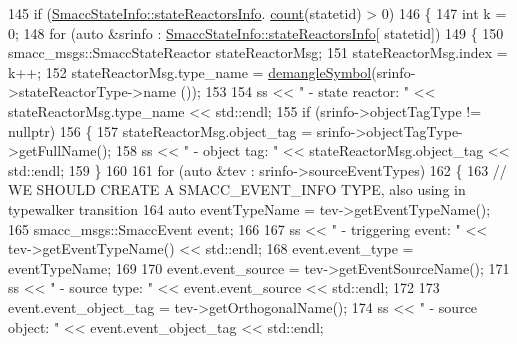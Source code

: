 \begin{DoxyCode}
145             \textcolor{keywordflow}{if} (\hyperlink{classsmacc_1_1introspection_1_1SmaccStateInfo_abd1d6ca5060c87f6bd11fde3e5b2ac4d}{SmaccStateInfo::stateReactorsInfo}.
      \hyperlink{namespacesm__fetch__two__table__whiskey__pour_acbce06cd0c9048e8be6a258e2c406986}{count}(statetid) > 0)
146             \{
147                 \textcolor{keywordtype}{int} k = 0;
148                 \textcolor{keywordflow}{for} (\textcolor{keyword}{auto} &srinfo : \hyperlink{classsmacc_1_1introspection_1_1SmaccStateInfo_abd1d6ca5060c87f6bd11fde3e5b2ac4d}{SmaccStateInfo::stateReactorsInfo}[
      statetid])
149                 \{
150                     smacc\_msgs::SmaccStateReactor stateReactorMsg;
151                     stateReactorMsg.index = k++;
152                     stateReactorMsg.type\_name = \hyperlink{namespacesmacc_1_1introspection_a2f495108db3e57604d8d3ff5ef030302}{demangleSymbol}(srinfo->stateReactorType->name
      ());
153 
154                     ss << \textcolor{stringliteral}{" - state reactor: "} << stateReactorMsg.type\_name << std::endl;
155                     \textcolor{keywordflow}{if} (srinfo->objectTagType != \textcolor{keyword}{nullptr})
156                     \{
157                         stateReactorMsg.object\_tag = srinfo->objectTagType->getFullName();
158                         ss << \textcolor{stringliteral}{"        - object tag: "} << stateReactorMsg.object\_tag << std::endl;
159                     \}
160 
161                     \textcolor{keywordflow}{for} (\textcolor{keyword}{auto} &tev : srinfo->sourceEventTypes)
162                     \{
163                         \textcolor{comment}{// WE SHOULD CREATE A SMACC\_EVENT\_INFO TYPE, also using in typewalker transition}
164                         \textcolor{keyword}{auto} eventTypeName = tev->getEventTypeName();
165                         smacc\_msgs::SmaccEvent event;
166 
167                         ss << \textcolor{stringliteral}{"             - triggering event: "} << tev->getEventTypeName() << std::endl;
168                         \textcolor{keyword}{event}.event\_type = eventTypeName;
169 
170                         \textcolor{keyword}{event}.event\_source = tev->getEventSourceName();
171                         ss << \textcolor{stringliteral}{"                 - source type: "} << \textcolor{keyword}{event}.event\_source << std::endl;
172 
173                         \textcolor{keyword}{event}.event\_object\_tag = tev->getOrthogonalName();
174                         ss << \textcolor{stringliteral}{"                 - source object: "} << \textcolor{keyword}{event}.event\_object\_tag << std::endl;

\end{DoxyCode}
